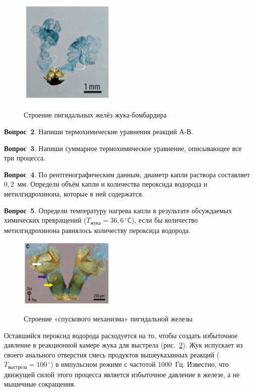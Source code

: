 \setlength{\columnsep}{5.2pt}
\begin{figure}{\includegraphics[width=4.6cm]{images/10-2.png}}\caption{Строение пи\-ги\-даль\-ных желёз жука-бом\-бар\-ди\-ра}
\label{fig:image2}\end{figure}
\mbox{\textbf{Вопрос 2}.} Напиши термохимические уравнения реакций А-В.
\vspace{1ex}
 	
\mbox{\textbf{Вопрос 3}.} Напиши суммарное термохимическое уравнение, описывающее все три процесса.\vspace{1ex}
    
\mbox{\textbf{Вопрос 4}.} По рентгенографическим данным, диаметр капли раствора составляет $0{,}2$~мм. Определи объём капли и количества пероксида водорода и метилгидрохинона, которые в ней содержатся.\vspace{1ex}
    
\mbox{\textbf{Вопрос 5}.} Определи температуру нагрева капли в результате обсуждаемых химических превращений ($T_{\text{жука}} = 36{,}6\,^\circ\mathsf{C}$), если бы количество метилгидрохинона равнялось количеству пероксида водорода.\vspace{1ex} 	
    
\setlength{\intextsep}{0.2pt} 
\setlength{\columnsep}{15.2pt}
\begin{figure}{\includegraphics[width=4.6cm]{images/10-3.png}}\caption{Строение «спускового механизма» пигидальной железы}\label{fig:image3}
\end{figure}
Оставшийся пероксид водорода расходуется на то, чтобы создать избыточное давление в реакционной камере жука для выстрела (рис.~\ref{fig:image3}). Жук испускает из своего анального отверстия смесь продуктов вышеуказанных реакций ($T_{\text{выстрела}} = 100\,^\circ$) в импульсном режиме с частотой $1000$~Гц. Известно, что движущей силой этого процесса является избыточное давление в железе, а не мышечные сокращения.\vspace{1ex}

